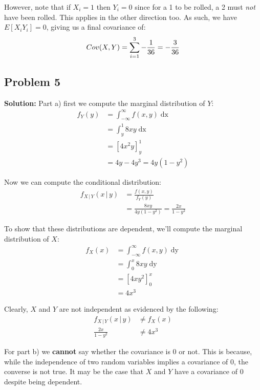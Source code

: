 \documentclass{article}
\newcommand*\eval[3]{\left[#1\right]_{#2}^{#3}}
\newcommand*\pbar[0]{\,|\,}
\begin{document}
However, note that if $X_i=1$ then $Y_i=0$ since for a 1 to be rolled, a 2 must \textit{not} have been rolled. This applies in the other direction too. As such, we have $E[X_iY_i]=0$, giving us a final covariance of:
\begin{equation*}
    Cov(X,Y)=\sum_{i=1}^3 -\frac{1}{36}=-\frac{3}{36}\\
\end{equation*}

\subsection*{Problem 5}
\noindent\textbf{Solution:} Part a) first we compute the marginal distribution of $Y$:
\begin{align*}
    f_Y(y)&=\int_{-\infty}^\infty f(x,y)\mathop{dx}\\
    &=\int^1_y 8xy\mathop{dx}\\
    &=\eval{4x^2y}{y}{1}\\
    &=4y-4y^3=4y(1-y^2)
\end{align*}

Now we can compute the conditional distribution:
\begin{align*}
    f_{X\pbar Y}(x\pbar y)&=\frac{f(x,y)}{f_Y(y)}\\
    &=\frac{8xy}{4y(1-y^2)}=\frac{2x}{1-y^2}
\end{align*}

To show that these distributions are dependent, we'll compute the marginal distribution of $X$:
\begin{align*}
    f_X(x)&=\int_{-\infty}^\infty f(x,y)\mathop{dy}\\
    &=\int^x_0 8xy\mathop{dy}\\
    &=\eval{4xy^2}{0}{x}\\
    &=4x^3
\end{align*}

Clearly, $X$ and $Y$ are not independent as evidenced by the following:
\begin{align*}
    f_{X\pbar Y}(x\pbar y)&\not=f_X(x)\\
    \frac{2x}{1-y^2}&\not=4x^3
\end{align*}

For part b) we \textbf{cannot} say whether the covariance is 0 or not. This is because, while the independence of two random variables implies a covariance of 0, the converse is not true. It may be the case that $X$ and $Y$ have a covariance of 0 despite being dependent.
\end{document}

